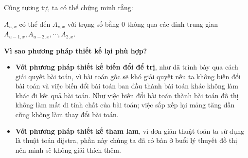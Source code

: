 \documentclass[12pt,a4paper]{article}
\begin{document}
Cũng tương tự, ta có thể chứng minh rằng: 

$A_{u, x}$ có thể đến $A_{v, x}$ với trọng số bằng $0$ thông qua các đỉnh trung gian $A_{u-1, x}, A_{u-2, x}, \cdots, A_{2, x}$.

\textbf{Vì sao phương pháp thiết kế lại phù hợp?}
\begin{itemize}
	\item \textbf{Với phương pháp thiết kế biến đổi để trị}, như đã trình bày qua cách giải quyết bài toán, vì bài toán gốc sẽ khó giải quyết nếu ta không biến đổi bài toán và việc biến đổi bài toán ban đầu thành bài toán khác không làm khác đi kết quả bài toán. Như việc biến đổi bài toán thành bài toán đồ thị không làm mất đi tính chất của bài toán; việc sắp xếp lại mảng tăng dần cũng không làm thay đổi bài toán. 
	\item \textbf{Với phương pháp thiết kế tham lam}, vì đơn giản thuật toán ta sử dụng là thuật toán dijstra, phần này chúng ta đã có bàn ở buổi lý thuyết đồ thị nên mình sẽ không giải thích thêm.
\end{itemize}
\end{document}
